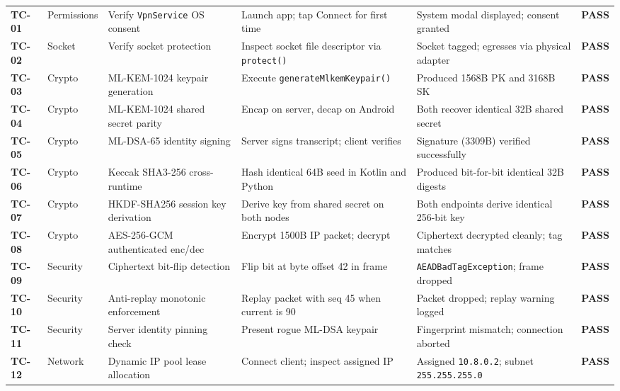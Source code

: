 \begin{longtable}{@{}P{1.4cm}P{2.6cm}P{3.4cm}P{3.2cm}P{3.2cm}P{1.2cm}@{}}
  \textbf{TC-01} & Permissions & Verify \texttt{VpnService} OS consent & Launch app; tap Connect for first time & System modal displayed; consent granted & \textbf{PASS} \\
  \addlinespace
  \textbf{TC-02} & Socket & Verify socket protection & Inspect socket file descriptor via \texttt{protect()} & Socket tagged; egresses via physical adapter & \textbf{PASS} \\
  \addlinespace
  \textbf{TC-03} & Crypto & ML-KEM-1024 keypair generation & Execute \texttt{generateMlkemKeypair()} & Produced 1568B PK and 3168B SK & \textbf{PASS} \\
  \addlinespace
  \textbf{TC-04} & Crypto & ML-KEM-1024 shared secret parity & Encap on server, decap on Android & Both recover identical 32B shared secret & \textbf{PASS} \\
  \addlinespace
  \textbf{TC-05} & Crypto & ML-DSA-65 identity signing & Server signs transcript; client verifies & Signature (3309B) verified successfully & \textbf{PASS} \\
  \addlinespace
  \textbf{TC-06} & Crypto & Keccak SHA3-256 cross-runtime & Hash identical 64B seed in Kotlin and Python & Produced bit-for-bit identical 32B digests & \textbf{PASS} \\
  \addlinespace
  \textbf{TC-07} & Crypto & HKDF-SHA256 session key derivation & Derive key from shared secret on both nodes & Both endpoints derive identical 256-bit key & \textbf{PASS} \\
  \addlinespace
  \textbf{TC-08} & Crypto & AES-256-GCM authenticated enc/dec & Encrypt 1500B IP packet; decrypt & Ciphertext decrypted cleanly; tag matches & \textbf{PASS} \\
  \addlinespace
  \textbf{TC-09} & Security & Ciphertext bit-flip detection & Flip bit at byte offset 42 in frame & \texttt{AEADBadTagException}; frame dropped & \textbf{PASS} \\
  \addlinespace
  \textbf{TC-10} & Security & Anti-replay monotonic enforcement & Replay packet with seq 45 when current is 90 & Packet dropped; replay warning logged & \textbf{PASS} \\
  \addlinespace
  \textbf{TC-11} & Security & Server identity pinning check & Present rogue ML-DSA keypair & Fingerprint mismatch; connection aborted & \textbf{PASS} \\
  \addlinespace
  \textbf{TC-12} & Network & Dynamic IP pool lease allocation & Connect client; inspect assigned IP & Assigned \texttt{10.8.0.2}; subnet \texttt{255.255.255.0} & \textbf{PASS} \\

\end{longtable}
